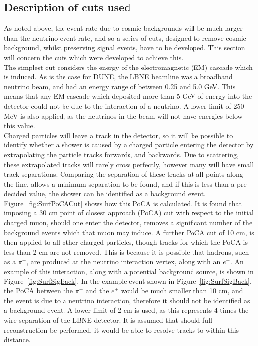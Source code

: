 \subsection{Description of cuts used} \label{sec:SurfCutList}
As noted above, the event rate due to cosmic backgrounds will be much larger than the neutrino event rate, and so a series of cuts, designed to remove cosmic background, whilst preserving signal events, have to be developed. This section will concern the cuts which were developed to achieve this. \\

The simplest cut considers the energy of the electromagnetic (EM) cascade which is induced. As is the case for DUNE, the LBNE beamline was a broadband neutrino beam, and had an energy range of between 0.25 and 5.0 GeV. This means that any EM cascade which deposited more than 5 GeV of energy into the detector could not be due to the interaction of a neutrino. A lower limit of 250 MeV is also applied, as the neutrinos in the beam will not have energies below this value. \\

Charged particles will leave a track in the detector, so it will be possible to identify whether a shower is caused by a charged particle entering the detector by extrapolating the particle tracks forwards, and backwards. Due to scattering, these extrapolated tracks will rarely cross perfectly, however many will have small track separations. Comparing the separation of these tracks at all points along the line, allows a minimum separation to be found, and if this is less than a pre-decided value, the shower can be identified as a background event. Figure~\ref{fig:SurfPoCACut} shows how this PoCA is calculated. It is found that imposing a $30$ cm point of closest approach (PoCA) cut with respect to the initial charged muon, should one enter the detector, removes a significant number of the background events which that muon may induce. A further PoCA cut of 10 cm, is then applied to all other charged particles, though tracks for which the PoCA is less than 2 cm are not removed. This is because it is possible that hadrons, such as a $\pi^{+}$, are produced at the neutrino interaction vertex, along with an $e^{+}$. An example of this interaction, along with a potential background source, is shown in Figure~\ref{fig:SurfSigBack}. In the example event shown in Figure~\ref{fig:SurfSigBack}, the PoCA between the $\pi^{+}$ and the $e^{+}$ would be much smaller than 10 cm, and the event is due to a neutrino interaction, therefore it should not be identified as a background event. A lower limit of 2 cm is used, as this represents 4 times the wire separation of the LBNE detector. It is assumed that should full reconstruction be performed, it would be able to resolve tracks to within this distance. \\

